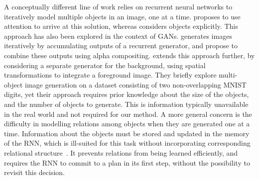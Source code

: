 \documentclass{article}
\begin{document}
A conceptually different line of work relies on recurrent neural networks to iteratively model multiple objects in an image, one at a time.
\cite{gregor2015draw} proposes to use attention to arrive at this solution, whereas \cite{eslami2016attend} considers objects explicitly.
This approach has also been explored in the context of GANs.
\cite{im2016generating} generates images iteratively by accumulating outputs of a recurrent generator, and \cite{kwak2016generating} propose to combine these outputs using alpha compositing.
\cite{yang2017lr} extends this approach further, by considering a separate generator for the background, using spatial transformations to integrate a foreground image.
They briefly explore multi-object image generation on a dataset consisting of two non-overlapping MNIST digits, yet their approach requires prior knowledge about the size of the objects, and the number of objects to generate.
This is information typically unavailable in the real world and not required for our method.
A more general concern is the difficulty in modelling relations among objects when they are generated one at a time.
Information about the objects must be stored and updated in the memory of the RNN, which is ill-suited for this task without incorporating corresponding relational structure~\citep{santoro2018relational}.
It prevents relations from being learned efficiently, and requires the RNN to commit to a plan in its first step, without the possibility to revisit this decision.
\end{document}
